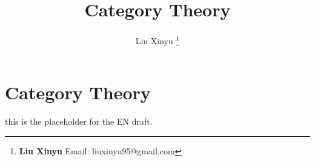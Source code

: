 \documentclass{article}
\begin{document}
\title{Category Theory}

\author{Liu Xinyu
\thanks{{\bfseries Liu Xinyu} \newline
  Email: liuxinyu95@gmail.com}}

\maketitle
\fi


\ifx\wholebook\relax
\chapter{Category Theory}
\fi

this is the placeholder for the EN draft.

\ifx\wholebook\relax \else
\begin{thebibliography}{99}

\end{thebibliography}

\expandafter\enddocument

\fi
\end{document}
